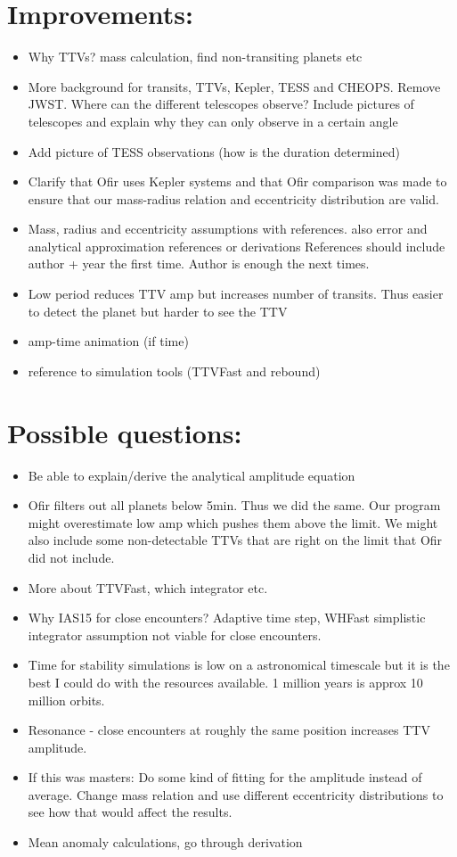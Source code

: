 \documentclass[12pt]{report}
\begin{document}
\section*{Improvements:}
\begin{itemize}
\item Why TTVs? mass calculation, find non-transiting planets etc
\item More background for transits, TTVs, Kepler, TESS and CHEOPS. Remove JWST. Where can the different telescopes observe? Include pictures of telescopes and explain why they can only observe in a certain angle
\item Add picture of TESS observations (how is the duration determined)
\item Clarify that Ofir uses Kepler systems and that Ofir comparison was made to ensure that our mass-radius relation and eccentricity distribution are valid.
\item Mass, radius and eccentricity assumptions with references. also error and analytical approximation references or derivations
References should include author + year the first time. Author is enough the next times.
\item Low period reduces TTV amp but increases number of transits. Thus easier to detect the planet but harder to see the TTV
\item amp-time animation (if time)
\item reference to simulation tools (TTVFast and rebound)
\end{itemize}


\section*{Possible questions:}
\begin{itemize}
	\item Be able to explain/derive the analytical amplitude equation
	\item Ofir filters out all planets below 5min. Thus we did the same. Our program might overestimate low amp which pushes them above the limit. We might also include some non-detectable TTVs that are right on the limit that Ofir did not include.
	\item More about TTVFast, which integrator etc.
	\item Why IAS15 for close encounters? Adaptive time step, WHFast simplistic integrator assumption not viable for close encounters.
	\item Time for stability simulations is low on a astronomical timescale but it is the best I could do with the resources available. 1 million years is approx 10 million orbits.
	\item Resonance - close encounters at roughly the same position increases TTV amplitude.
	\item If this was masters: Do some kind of fitting for the amplitude instead of average. Change mass relation and use different eccentricity distributions to see how that would affect the results.
	\item Mean anomaly calculations, go through derivation
\end{itemize}
\end{document}
